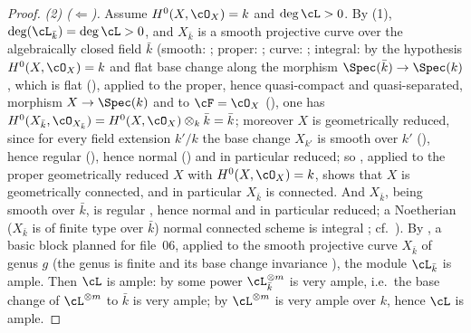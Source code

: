 \begin{proof}
\emph{(2) ($\Leftarrow$).}  Assume $H^0(X,\cO_X)=k$ and $\deg\cL>0$.  By
(1), $\deg(\cL_{\bar k})=\deg\cL>0$,
and $X_{\bar k}$ is a smooth projective curve over the algebraically
closed field $\bar k$ (smooth: ;
proper: ; curve: ;
integral: by the hypothesis $H^0(X,\cO_X)=k$ and flat base change
along the morphism $\Spec(\bar k)\to\Spec(k)$, which is flat
(), applied to the
proper, hence quasi-compact and quasi-separated, morphism
$X\to\Spec(k)$ and to $\cF=\cO_X$
(), one has
$H^0(X_{\bar k},\cO_{X_{\bar k}})=H^0(X,\cO_X)\otimes_k\bar k=\bar k$;
moreover $X$ is geometrically reduced, since for every field extension
$k'/k$ the base change $X_{k'}$ is smooth over $k'$
(), hence regular
(), hence normal
() and in particular reduced; so
, applied to the proper geometrically
reduced $X$ with $H^0(X,\cO_X)=k$, shows that $X$ is geometrically
connected, and in particular $X_{\bar k}$ is connected.  And
$X_{\bar k}$, being smooth over
$\bar k$, is regular , hence normal
 and in particular reduced; a Noetherian
($X_{\bar k}$ is of finite type over $\bar k$) normal connected scheme
is integral ; cf.\
).  By , a
basic block planned for file~06, applied to the smooth projective curve
$X_{\bar k}$ of genus $g$ (the genus is finite
 and its base change invariance
), the module $\cL_{\bar k}$ is ample.
Then $\cL$ is ample: by \Cref{def:pcb-ample} some power
$\cL_{\bar k}^{\otimes m}$ is very ample, i.e.\ the base change of
$\cL^{\otimes m}$ to $\bar k$ is very ample; by
 $\cL^{\otimes m}$ is very ample over
$k$, hence $\cL$ is ample.
\end{proof}

